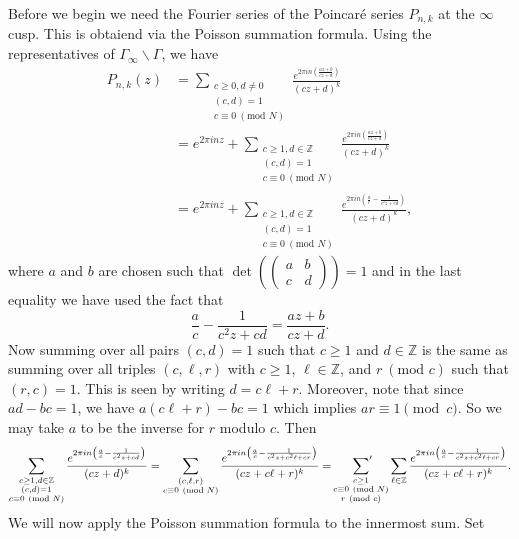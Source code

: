 \documentclass[12pt]{book}
\theoremstyle{definition}\newframedtheorem{method}{Method}
\newcommand{\psum}{\sideset{}{'}\sum}
\newcommand{\tmod}[1]{\ \left(\text{mod }#1\right)}
\newcommand{\Z}{\mathbb{Z}}
\newcommand{\G}{\Gamma}
\newcommand{\<}{\langle}
\renewcommand{\>}{\rangle}
\newcommand{\GG}{\G_{\infty}\backslash\G}
\begin{document}
      Before we begin we need the Fourier series of the Poincar\'e series $P_{n,k}$ at the $\infty$ cusp. This is obtaiend via the Poisson summation formula. Using the representatives of $\GG$, we have
      \begin{align*}
         P_{n,k}(z) &= \sum_{\substack{c \ge 0, d \neq 0 \\ (c,d) = 1 \\ c \equiv 0 \tmod{N}}}\frac{e^{2\pi in\left(\frac{az+b}{cz+d}\right)}}{(cz+d)^{k}} \\
         &= e^{2\pi inz}+\sum_{\substack{c \ge 1, d \in \Z \\ (c,d) = 1 \\ c \equiv 0 \tmod{N}}}\frac{e^{2\pi in\left(\frac{az+b}{cz+d}\right)}}{(cz+d)^{k}} \\
         &= e^{2\pi inz}+\sum_{\substack{c \ge 1, d \in \Z \\ (c,d) = 1 \\ c \equiv 0 \tmod{N}}}\frac{e^{2\pi in\left(\frac{a}{c}-\frac{1}{c^{2}z+cd}\right)}}{(cz+d)^{k}},
      \end{align*}
      where $a$ and $b$ are chosen such that $\det\left(\begin{pmatrix} a & b \\ c & d \end{pmatrix}\right) = 1$ and in the last equality we have used the fact that
      \[
        \frac{a}{c}-\frac{1}{c^{2}z+cd} = \frac{az+b}{cz+d}.
      \]
      Now summing over all pairs $(c,d) = 1$ such that $c \ge 1$ and $d \in \Z$ is the same as summing over all triples $(c,\ell,r)$ with $c \ge 1$, $\ell \in \Z$, and $r \tmod{c}$ such that $(r,c) = 1$. This is seen by writing $d = c\ell+r$. Moreover, note that since $ad-bc = 1$, we have $a(c\ell+r)-bc = 1$ which implies $ar \equiv 1 \pmod{c}$. So we may take $a$ to be the inverse for $r$ modulo $c$. Then
      \[
        \sum_{\substack{c \ge 1, d \in \Z \\ (c,d) = 1 \\ c \equiv 0 \tmod{N}}}\frac{e^{2\pi in\left(\frac{a}{c}-\frac{1}{c^{2}z+cd}\right)}}{(cz+d)^{k}} = \sum_{\substack{(c,\ell,r) \\ c \equiv 0 \tmod{N}}}\frac{e^{2\pi in\left(\frac{a}{c}-\frac{1}{c^{2}z+c^{2}\ell+cr}\right)}}{(cz+c\ell+r)^{k}} = \psum_{\substack{c \ge 1 \\ c \equiv 0 \tmod{N} \\ r \tmod{c}}}\sum_{\ell \in \Z}\frac{e^{2\pi in\left(\frac{a}{c}-\frac{1}{c^{2}z+c^{2}\ell+cr}\right)}}{(cz+c\ell+r)^{k}}.
      \]
      We will now apply the Poisson summation formula to the innermost sum. Set
\end{document}
